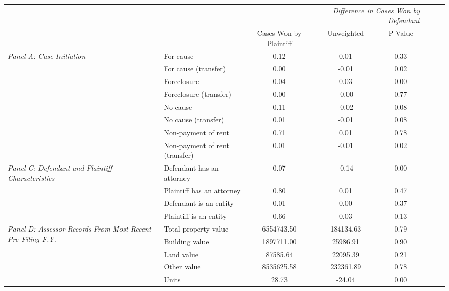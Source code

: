 \begin{tabular}{llcccccc}
\toprule
 &  & \textit{} & \multicolumn{2}{r}{\textit{Difference in Cases Won by Defendant}} \\
 &  & Cases Won by Plaintiff & Unweighted & P-Value \\
\midrule
\multirow[c]{8}{4cm}{\textit{Panel A: Case Initiation}} & For cause & 0.12 & 0.01 & 0.33 \\
 & For cause (transfer) & 0.00 & -0.01 & 0.02 \\
 & Foreclosure & 0.04 & 0.03 & 0.00 \\
 & Foreclosure (transfer) & 0.00 & -0.00 & 0.77 \\
 & No cause & 0.11 & -0.02 & 0.08 \\
 & No cause (transfer) & 0.01 & -0.01 & 0.08 \\
 & Non-payment of rent & 0.71 & 0.01 & 0.78 \\
 & Non-payment of rent (transfer) & 0.01 & -0.01 & 0.02 \\
\cline{1-5}
\multirow[c]{4}{4cm}{\textit{Panel C: Defendant and Plaintiff Characteristics}} & Defendant has an attorney & 0.07 & -0.14 & 0.00 \\
 & Plaintiff has an attorney & 0.80 & 0.01 & 0.47 \\
 & Defendant is an entity & 0.01 & 0.00 & 0.37 \\
 & Plaintiff is an entity & 0.66 & 0.03 & 0.13 \\
\cline{1-5}
\multirow[c]{5}{4cm}{\textit{Panel D: Assessor Records From Most Recent Pre-Filing F.Y.}} & Total property value & 6554743.50 & 184134.63 & 0.79 \\
 & Building value & 1897711.00 & 25986.91 & 0.90 \\
 & Land value & 87585.64 & 22095.39 & 0.21 \\
 & Other value & 8535625.58 & 232361.89 & 0.78 \\
 & Units & 28.73 & -24.04 & 0.00 \\
\cline{1-5}
\bottomrule
\end{tabular}
